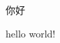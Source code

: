 \documentclass[12pt]{article}
\begin{document}
\begin{CJK}{UTF8}{baki}
\fontsize{12}{18pt}\selectfont

你好

\end{CJK}

hello world!
\end{document}
